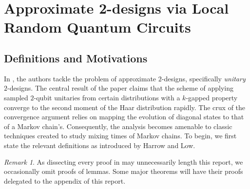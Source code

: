 \documentclass[12pt]{amsart}
\theoremstyle{definition}
\theoremstyle{remark}
\newtheorem{remark}[theorem]{Remark}
\numberwithin{equation}{section}
\theoremstyle{remark}
\begin{document}
\section{Approximate 2-designs via Local Random Quantum Circuits}

\subsection{Definitions and Motivations}
In \cite{harrlow}, the authors tackle the problem of approximate $2$-designs, specifically \emph{unitary} $2$-designs. The central result of the paper claims that the scheme of applying sampled $2$-qubit unitaries from certain distributions with a $k$-gapped property converge to the second moment of the Haar distribution rapidly. The crux of the convergence argument relies on mapping the evolution of  diagonal states to that of a Markov chain's.
Consequently, the analysis becomes amenable to classic techniques created to study mixing times of Markov chains. To begin, we first state the relevant definitions as introduced by Harrow and Low.
%
\begin{remark}
  As dissecting every proof in \cite{harrlow} may unnecessarily length this report, we occasionally omit proofs of lemmas. Some major theorems will have their proofs delegated to the appendix of this report.
\end{remark}
\end{document}
